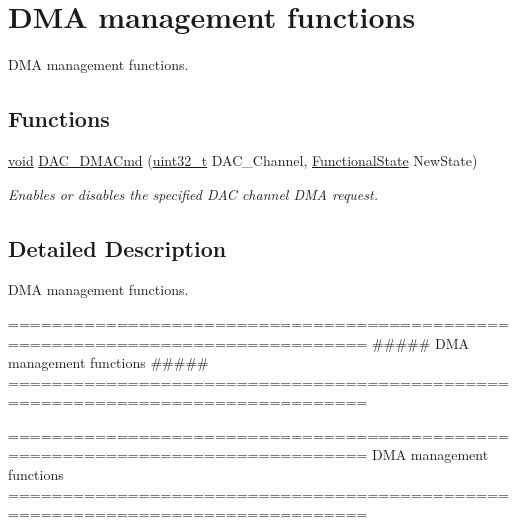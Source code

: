 \hypertarget{group___d_a_c___group2}{\section{D\-M\-A management functions}
\label{group___d_a_c___group2}
}


D\-M\-A management functions.  


\subsection*{Functions}
\begin{DoxyCompactItemize}
\item 
\hyperlink{group___n_a_m_e_ga18028b8badbf1ea7e704ccac3c488e82}{void} \hyperlink{group___d_a_c___group2_ga194cba38f60ace11658824f0250121f4}{D\-A\-C\-\_\-\-D\-M\-A\-Cmd} (\hyperlink{stdint_8h_a435d1572bf3f880d55459d9805097f62}{uint32\-\_\-t} D\-A\-C\-\_\-\-Channel, \hyperlink{group___exported__types_gac9a7e9a35d2513ec15c3b537aaa4fba1}{Functional\-State} New\-State)
\begin{DoxyCompactList}\small\item\em Enables or disables the specified D\-A\-C channel D\-M\-A request. \end{DoxyCompactList}\end{DoxyCompactItemize}


\subsection{Detailed Description}
D\-M\-A management functions. \begin{DoxyVerb} ===============================================================================
                    ##### DMA management functions #####
 ===============================================================================  \end{DoxyVerb}


\begin{DoxyVerb} ===============================================================================
                          DMA management functions
 ===============================================================================  \end{DoxyVerb}
 

